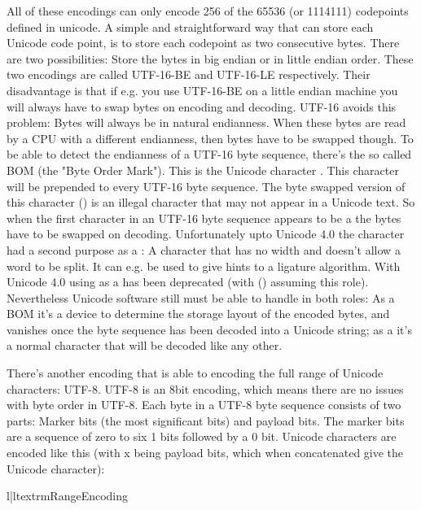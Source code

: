 All of these encodings can only encode 256 of the 65536 (or 1114111)
codepoints defined in unicode. A simple and straightforward way that
can store each Unicode code point, is to store each codepoint as two
consecutive bytes. There are two possibilities: Store the bytes in big
endian or in little endian order. These two encodings are called
UTF-16-BE and UTF-16-LE respectively. Their disadvantage is that if
e.g. you use UTF-16-BE on a little endian machine you will always have
to swap bytes on encoding and decoding. UTF-16 avoids this problem:
Bytes will always be in natural endianness. When these bytes are read
by a CPU with a different endianness, then bytes have to be swapped
though. To be able to detect the endianness of a UTF-16 byte sequence,
there's the so called BOM (the "Byte Order Mark"). This is the Unicode
character . This character will be prepended to every UTF-16
byte sequence. The byte swapped version of this character () is
an illegal character that may not appear in a Unicode text. So when
the first character in an UTF-16 byte sequence appears to be a 
the bytes have to be swapped on decoding. Unfortunately upto Unicode
4.0 the character  had a second purpose as a : A character that has no width and doesn't allow a
word to be split. It can e.g. be used to give hints to a ligature
algorithm. With Unicode 4.0 using  as a  has been deprecated (with  () assuming
this role). Nevertheless Unicode software still must be able to handle
 in both roles: As a BOM it's a device to determine the storage
layout of the encoded bytes, and vanishes once the byte sequence has
been decoded into a Unicode string; as a 
it's a normal character that will be decoded like any other.

There's another encoding that is able to encoding the full range of
Unicode characters: UTF-8. UTF-8 is an 8bit encoding, which means
there are no issues with byte order in UTF-8. Each byte in a UTF-8
byte sequence consists of two parts: Marker bits (the most significant
bits) and payload bits. The marker bits are a sequence of zero to six
1 bits followed by a 0 bit. Unicode characters are encoded like this
(with x being payload bits, which when concatenated give the Unicode
character):

\begin{tableii}{l|l}{textrm}{Range}{Encoding}
\end{tableii}

